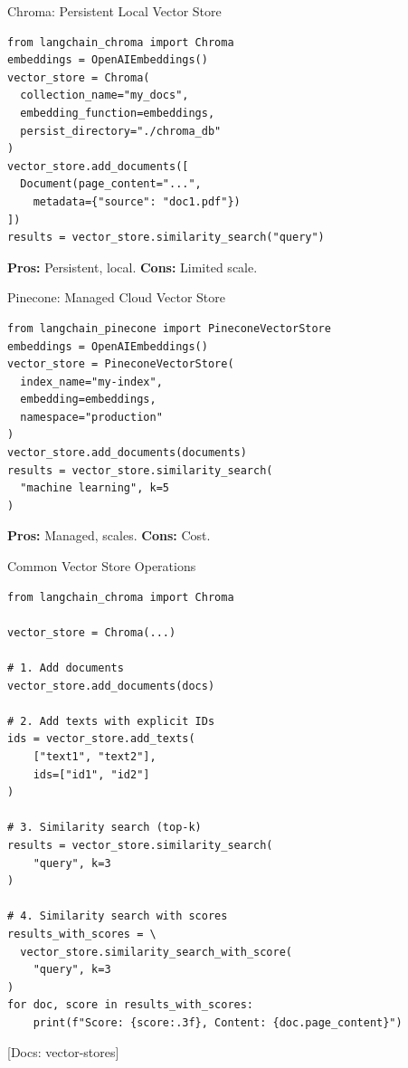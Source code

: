 \documentclass[aspectratio=169,11pt]{beamer}
\newcommand{\docref}[1]{{\scriptsize\color{docgray}[Docs: #1]}}
\begin{document}
\begin{frame}[fragile]{Chroma: Persistent Local Vector Store}
  \begin{lstlisting}[basicstyle=\ttfamily\tiny]
from langchain_chroma import Chroma
embeddings = OpenAIEmbeddings()
vector_store = Chroma(
  collection_name="my_docs",
  embedding_function=embeddings,
  persist_directory="./chroma_db"
)
vector_store.add_documents([
  Document(page_content="...",
    metadata={"source": "doc1.pdf"})
])
results = vector_store.similarity_search("query")
  \end{lstlisting}

  \textbf{Pros:} Persistent, local. \textbf{Cons:} Limited scale.
\end{frame}

\begin{frame}[fragile]{Pinecone: Managed Cloud Vector Store}
  \begin{lstlisting}[basicstyle=\ttfamily\tiny]
from langchain_pinecone import PineconeVectorStore
embeddings = OpenAIEmbeddings()
vector_store = PineconeVectorStore(
  index_name="my-index",
  embedding=embeddings,
  namespace="production"
)
vector_store.add_documents(documents)
results = vector_store.similarity_search(
  "machine learning", k=5
)
  \end{lstlisting}

  \textbf{Pros:} Managed, scales. \textbf{Cons:} Cost.
\end{frame}

\begin{frame}[fragile]{Common Vector Store Operations}
  \begin{lstlisting}
from langchain_chroma import Chroma

vector_store = Chroma(...)

# 1. Add documents
vector_store.add_documents(docs)

# 2. Add texts with explicit IDs
ids = vector_store.add_texts(
    ["text1", "text2"],
    ids=["id1", "id2"]
)

# 3. Similarity search (top-k)
results = vector_store.similarity_search(
    "query", k=3
)

# 4. Similarity search with scores
results_with_scores = \
  vector_store.similarity_search_with_score(
    "query", k=3
)
for doc, score in results_with_scores:
    print(f"Score: {score:.3f}, Content: {doc.page_content}")
  \end{lstlisting}

  \vspace{0.07cm}
  \docref{vector-stores}
\end{frame}
\end{document}
